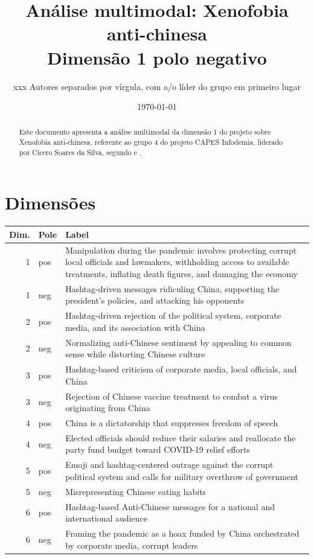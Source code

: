 \documentclass[aspectratio=169]{article}
\title{Análise multimodal: Xenofobia anti-chinesa\\Dimensão 1 polo negativo}
\author{xxx Autores separados por vírgula, com a/o líder do grupo em primeiro lugar}
\date{\today}
\begin{document}
\maketitle

\begin{abstract}
Este documento apresenta a análise multimodal da dimensão 1 do projeto sobre Xenofobia anti-chinesa, referente ao grupo 4 do projeto CAPES Infodemia, liderado por Cícero Soares da Silva, segundo  e .
\end{abstract}

\section{Dimensões}

\begin{table}[H]
\begin{tabular}{r l  p{}} \hline
Dim.&Pole& Label \\ \hline
1&pos&Manipulation during the pandemic involves protecting corrupt local officials and lawmakers, withholding access to available treatments, inflating death figures, and damaging the economy \\
1&neg&Hashtag-driven messages ridiculing China, supporting the president's policies, and attacking his opponents \\ \hline
2&pos&Hashtag-driven rejection of the political system, corporate media, and its association with China \\
2&neg&Normalizing anti-Chinese sentiment by appealing to common sense while distorting Chinese culture \\  \hline
3&pos&Hashtag-based criticism of corporate media, local officials, and China \\
3&neg&Rejection of Chinese vaccine treatment to combat a virus originating from China \\  \hline
4&pos&China is a dictatorship that suppresses freedom of speech  \\
4&neg&Elected officials should reduce their salaries and reallocate the party fund budget toward COVID-19 relief efforts \\  \hline
5&pos&Emoji and hashtag-centered outrage against the corrupt political system and calls for military overthrow of government  \\
5&neg&Misrepresenting Chinese eating habits \\  \hline
6&pos&Hashtag-based Anti-Chinese messages for a national and international audience  \\
6&neg&Framing the pandemic as a hoax funded by China orchestrated by corporate media, corrupt leaders \\
\hline
\end{tabular}
\end{table}
\end{document}
